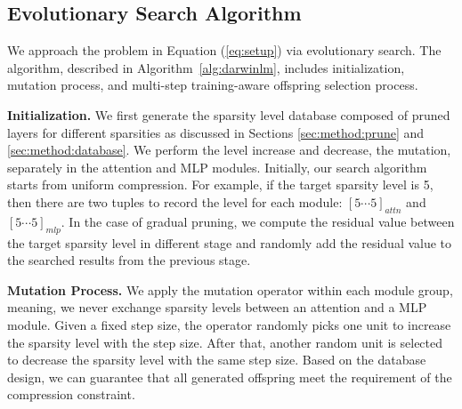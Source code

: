 \subsection{Evolutionary Search Algorithm}
We approach the problem in Equation (\ref{eq:setup}) via evolutionary search. The  algorithm, described in Algorithm~\ref{alg:darwinlm}, includes initialization, mutation process, and multi-step training-aware offspring selection process. 

\label{sec:method:alg}
\noindent \textbf{Initialization.} We first generate the sparsity level database composed of pruned layers for different sparsities as discussed in Sections \ref{sec:method:prune} and \ref{sec:method:database}. We perform the level increase and decrease, the mutation, separately in the attention and MLP modules.  Initially, our search algorithm starts from uniform compression. For example, if the target sparsity level is 5, then there are two tuples to record the level for each module: $[5 \cdots 5]_{attn}$ and $[5 \cdots 5]_{mlp}$. In the case of gradual pruning, we compute the residual value between the target sparsity level in different stage and randomly add the residual value to the searched results from the previous stage. 

\noindent \textbf{Mutation Process.} We apply the mutation operator within each module group, meaning, we never exchange sparsity levels between an attention and a MLP module. Given a fixed step size, the operator randomly picks one unit to increase the sparsity level with the step size. After that, another random unit is selected to decrease the sparsity level with the same step size. Based on the database design, we can guarantee that all generated offspring meet the requirement of the compression constraint.




